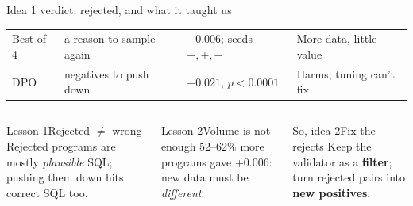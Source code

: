 \documentclass[11pt,aspectratio=169]{beamer}
\begin{document}
\begin{frame}{Idea 1 verdict: rejected, and what it taught us}
\vspace{0.05cm}
{\footnotesize\setlength{\tabcolsep}{5pt}
\begin{tabular}{@{}L{2.2cm}L{3.9cm}L{3.4cm}>{}L{3.6cm}@{}}
\toprule
{} &  &  & \\\midrule
Best-of-4 & a reason to sample again & $+0.006$; seeds $+,+,-$ & More data, little value\\
DPO & negatives to push down & $-0.021$, $p<0.0001$ & Harms; tuning can't fix\\
\bottomrule
\end{tabular}}
\vspace{0.3cm}
\begin{columns}[T]
\begin{tscard}[tsred]{Lesson 1}{Rejected $\neq$ wrong}
Rejected programs are mostly \emph{plausible} SQL; pushing them down hits correct SQL too.
\end{tscard}
\begin{tscard}[tsred]{Lesson 2}{Volume is not enough}
52--62\% more programs gave +0.006: new data must be \emph{different}.
\end{tscard}
\begin{tscard}[tsgreen]{So, idea 2}{Fix the rejects}
Keep the validator as a \textbf{filter}; turn rejected pairs into \textbf{new positives}.
\end{tscard}
\end{columns}
\end{frame}
\end{document}
